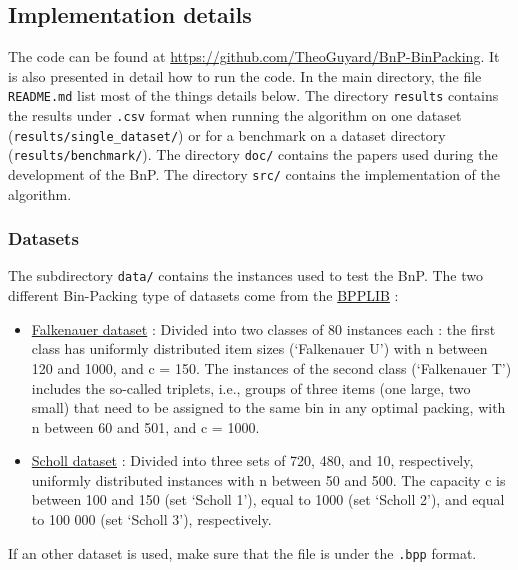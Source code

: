 \subsection{Implementation details}

\noindent The code can be found at \href{https://github.com/TheoGuyard/BnP-BinPacking}{https://github.com/TheoGuyard/BnP-BinPacking}. It is also presented in detail how to run the code. In the main directory, the file \texttt{README.md} list most of the things details below. The directory \texttt{results} contains the results under \texttt{.csv} format when running the algorithm on one dataset (\texttt{results/single\_dataset/}) or for a benchmark on a dataset directory (\texttt{results/benchmark/}). The directory \texttt{doc/} contains the papers used during the development of the BnP. The directory \texttt{src/} contains the implementation of the algorithm.\\

\subsubsection{Datasets}
The subdirectory \texttt{data/} contains the instances used to test the BnP. The two different Bin-Packing type of datasets come from the \href{http://or.dei.unibo.it/library/bpplib}{BPPLIB} :
\begin{itemize}
	\item \href{https://link.springer.com/article/10.1007/BF00226291}{Falkenauer dataset} : Divided into two classes of 80 instances each : the first class has uniformly distributed item sizes (‘Falkenauer U’) with n between 120 and 1000, and c = 150. The instances of the second class (‘Falkenauer T’) includes the so-called triplets, i.e., groups of three items (one large, two small) that need to be assigned to the same bin in any optimal packing, with n between 60 and 501, and c = 1000.
	\item \href{https://www.sciencedirect.com/science/article/abs/pii/S0305054896000822}{Scholl dataset} : Divided into three sets of 720, 480, and 10, respectively, uniformly distributed instances with n between 50 and 500. The capacity c is between 100 and 150 (set ‘Scholl 1’), equal to 1000 (set ‘Scholl 2’), and equal to 100 000 (set ‘Scholl 3’), respectively.
\end{itemize}
If an other dataset is used, make sure that the file is under the \texttt{.bpp} format. \\

